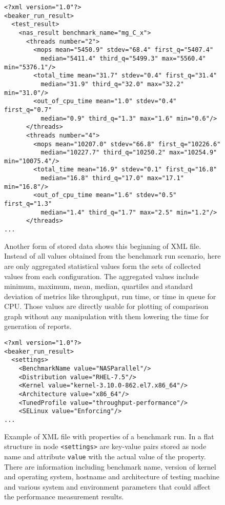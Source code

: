 \begin{figure}
  \small
  \begin{verbatim}
<?xml version="1.0"?>
<beaker_run_result>
  <test_result>
    <nas_result benchmark_name="mg_C_x">
      <threads number="2">
        <mops mean="5450.9" stdev="68.4" first_q="5407.4"
          median="5411.4" third_q="5499.3" max="5560.4" min="5376.1"/>
        <total_time mean="31.7" stdev="0.4" first_q="31.4"
          median="31.9" third_q="32.0" max="32.2" min="31.0"/>
        <out_of_cpu_time mean="1.0" stdev="0.4" first_q="0.7"
          median="0.9" third_q="1.3" max="1.6" min="0.6"/>
      </threads>
      <threads number="4">
        <mops mean="10207.0" stdev="66.8" first_q="10226.6"
          median="10227.7" third_q="10250.2" max="10254.9" min="10075.4"/>
        <total_time mean="16.9" stdev="0.1" first_q="16.8"
          median="16.8" third_q="17.0" max="17.1" min="16.8"/>
        <out_of_cpu_time mean="1.6" stdev="0.5" first_q="1.3"
          median="1.4" third_q="1.7" max="2.5" min="1.2"/>
      </threads>
...
\end{verbatim}
  \normalsize
  \caption{Another form of stored data shows this beginning of XML file. Instead
    of all values obtained from the benchmark run scenario, here are only
    aggregated statistical values form the sets of collected values from each
    configuration. The aggregated values include minimum, maximum, mean, median,
    quartiles and standard deviation of metrics like throughput, run time, or
    time in queue for CPU. Those values are directly usable for plotting of
    comparison graph without any manipulation with them lowering the time for
    generation of reports.}
  \label{fig:xml_sums}
\end{figure}

\begin{figure}
  \small
\begin{verbatim}
<?xml version="1.0"?>
<beaker_run_result>
  <settings>
    <BenchmarkName value="NASParallel"/>
    <Distribution value="RHEL-7.5"/>
    <Kernel value="kernel-3.10.0-862.el7.x86_64"/>
    <Architecture value="x86_64"/>
    <TunedProfile value="throughput-performance"/>
    <SELinux value="Enforcing"/>
...
\end{verbatim}
  \normalsize
  \caption{Example of XML file with properties of a benchmark run. In a flat
    structure in node \texttt{<settings>} are key-value pairs stored as node
    name and attribute \texttt{value} with the actual value of the property.
    There are information including benchmark name, version of kernel and
    operating system, hostname and architecture of testing machine and various
    system and environment parameters that could affect the performance
    measurement results.}
  \label{fig:xml_config}
\end{figure}

